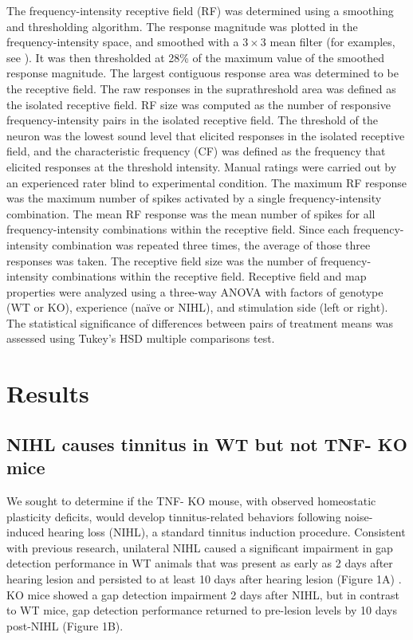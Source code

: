 The frequency-intensity receptive field (RF) was determined using a smoothing and thresholding algorithm. The response magnitude was plotted in the frequency-intensity space, and smoothed with a $3\times3$ mean filter (for examples, see \cite{Yang2013}). It was then thresholded at 28\% of the maximum value of the smoothed response magnitude. The largest contiguous response area was determined to be the receptive field. The raw responses in the suprathreshold area was defined as the isolated receptive field. RF size was computed as the number of responsive frequency-intensity pairs in the isolated receptive field. The threshold of the neuron was the lowest sound level that elicited responses in the isolated receptive field, and the characteristic frequency (CF) was defined as the frequency that elicited responses at the threshold intensity. Manual ratings were carried out by an experienced rater blind to experimental condition. The maximum RF response was the maximum number of spikes activated by a single frequency-intensity combination. The mean RF response was the mean number of spikes for all frequency-intensity combinations within the receptive field. Since each frequency-intensity combination was repeated three times, the average of those three responses was taken. The receptive field size was the number of frequency-intensity combinations within the receptive field.
Receptive field and map properties were analyzed using a three-way ANOVA with factors of genotype (WT or KO), experience (na\"ive or NIHL), and stimulation side (left or right). The statistical significance of differences between pairs of treatment means was assessed using Tukey's HSD multiple comparisons test.

\section{Results}

\subsection{NIHL causes tinnitus in WT but not TNF-\textalpha{} KO mice}

We sought to determine if the TNF-\textalpha{} KO mouse, with observed homeostatic plasticity deficits, would develop tinnitus-related behaviors following noise-induced hearing loss (NIHL), a standard tinnitus induction procedure. Consistent with previous research, unilateral NIHL caused a significant impairment in gap detection performance in WT animals that was present as early as 2 days after hearing lesion and persisted to at least 10 days after hearing lesion (Figure 1A) \cite{Turner2006, Llano2012}. KO mice showed a gap detection impairment 2 days after NIHL, but in contrast to WT mice, gap detection performance returned to pre-lesion levels by 10 days post-NIHL (Figure 1B).

